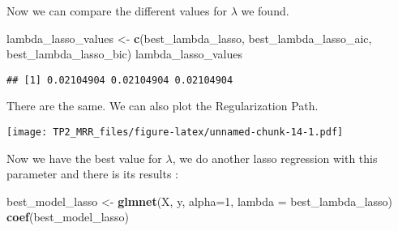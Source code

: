 \documentclass[
]{article}
\newenvironment{Shaded}{\begin{snugshade}}{\end{snugshade}}
\newcommand{\AttributeTok}[1]{\textcolor[rgb]{0.13,0.29,0.53}{#1}}
\newcommand{\DecValTok}[1]{\textcolor[rgb]{0.00,0.00,0.81}{#1}}
\newcommand{\FunctionTok}[1]{\textcolor[rgb]{0.13,0.29,0.53}{\textbf{#1}}}
\newcommand{\NormalTok}[1]{#1}
\newcommand{\OtherTok}[1]{\textcolor[rgb]{0.56,0.35,0.01}{#1}}
\newcommand{\SpecialCharTok}[1]{\textcolor[rgb]{0.81,0.36,0.00}{\textbf{#1}}}
\newcommand{\StringTok}[1]{\textcolor[rgb]{0.31,0.60,0.02}{#1}}
\begin{document}
Now we can compare the different values for \(\lambda\) we found.

\begin{Shaded}
\begin{Highlighting}[]
\NormalTok{lambda\_lasso\_values }\OtherTok{\textless{}{-}} \FunctionTok{c}\NormalTok{(best\_lambda\_lasso, best\_lambda\_lasso\_aic, best\_lambda\_lasso\_bic)}
\NormalTok{lambda\_lasso\_values}
\end{Highlighting}
\end{Shaded}

\begin{verbatim}
## [1] 0.02104904 0.02104904 0.02104904
\end{verbatim}

There are the same. We can also plot the Regularization Path.

\begin{Shaded}
\end{Shaded}

\texttt{[image: TP2\_MRR\_files/figure-latex/unnamed-chunk-14-1.pdf]}

Now we have the best value for \(\lambda\), we do another lasso
regression with this parameter and there is its results :

\begin{Shaded}
\begin{Highlighting}[]
\NormalTok{best\_model\_lasso }\OtherTok{\textless{}{-}} \FunctionTok{glmnet}\NormalTok{(X, y, }\AttributeTok{alpha=}\DecValTok{1}\NormalTok{, }\AttributeTok{lambda =}\NormalTok{ best\_lambda\_lasso)}
\FunctionTok{coef}\NormalTok{(best\_model\_lasso)}
\end{Highlighting}
\end{Shaded}
\end{document}
